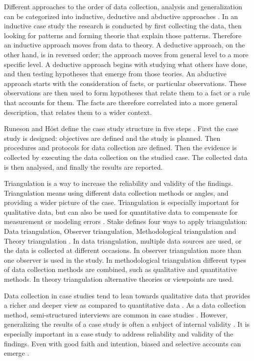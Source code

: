 \documentclass[english]{tktltiki2}
\theoremstyle{definition}
\theoremstyle{remark}
\begin{document}
Different approaches to the order of data collection, analysis and generalization can be categorized into inductive, deductive and abductive approaches \cite{dubois2002systematic}. In an inductive case study the research is conducted by first collecting the data, then looking for patterns and forming theorie that explain those patterns. Therefore an inductive approach moves from data to theory. A deductive approach, on the other hand, is in reversed order; the approach moves from general level to a more specific level. A deductive approach begins with studying what others have done, and then testing hypotheses that emerge from those teories. An abductive approach starts with the consideration of facts, or particular observations. These observations are then used to form hypotheses that relate them to a fact or a rule that accounts for them. The facts are therefore correlated into a more general description, that relates them to a wider context.

Runeson and Höst define the case study structure in five steps \cite{runeson2009guidelines}. First the case study is designed: objectives are defined and the study is planned. Then procedures and protocols for data collection are defined. Then the evidence is collected by executing the data collection on the studied case. The collected data is then analysed, and finally the results are reported.

Triangulation is a way to increase the reliability and validity of the findings. Triangulation means using different data collection methods or angles, and providing a wider picture of the case. Triangulation is especially important for qualitative data, but can also be used for quantitative data to compensate for measurement or modeling errors \cite{runeson2009guidelines}. Stake defines four ways to apply triangulation: Data triangulation, Observer triangulation, Methodological triangulation and Theory triangulation \cite{stake1995art}. In data triangulation, multiple data sources are used, or the data is collected at different occasions. In observer triangulation more than one observer is used in the study. In methodological triangulation different types of data collection methods are combined, such as qualitative and quantitative methods. In theory triangulation alternative theories or viewpoints are used.

Data collection in case studies tend to lean towards qualitative data that provides a richer and deeper view as compared to quantitative data \cite{runeson2009guidelines}. As a data collection method, semi-structured interviews are common in case studies \cite{runeson2009guidelines}. However, generalizing the results of a case study is often a subject of internal validity \cite{kitchenham2002preliminary}. It is especially important in a case study to address reliability and validity of the findings. Even with good faith and intention, biased and selective accounts can emerge \cite{robson2002real}. 
\end{document}

